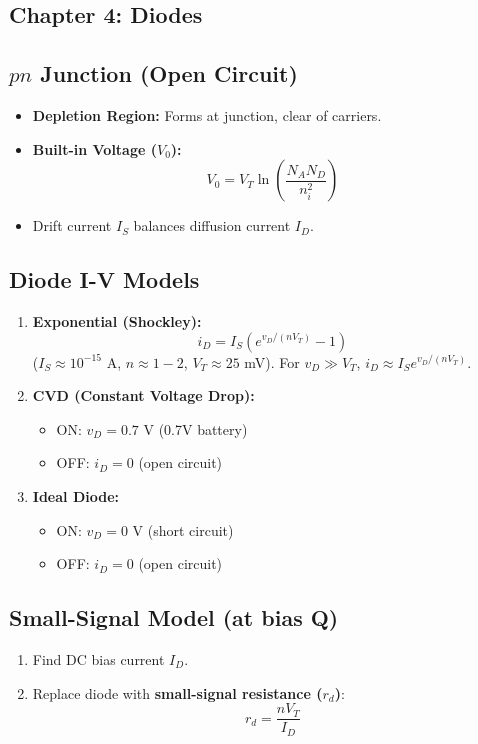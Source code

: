 \documentclass[10pt]{article}
\begin{document}
\begin{multicols*}{2}

\section{Chapter 4: Diodes}

\subsection*{$pn$ Junction (Open Circuit)}
\begin{itemize}\itemsep0pt
    \item \textbf{Depletion Region:} Forms at junction, clear of carriers.
    \item \textbf{Built-in Voltage ($V_0$):}
    \[ V_0 = V_T \ln\left(\frac{N_A N_D}{n_i^2}\right) \]
    \item Drift current $I_S$ balances diffusion current $I_D$.
\end{itemize}

\subsection*{Diode I-V Models}
\begin{enumerate}\itemsep0pt
    \item \textbf{Exponential (Shockley):}
    \[ i_D = I_S (e^{v_D / (nV_T)} - 1) \]
    ($I_S \approx 10^{-15}$ A, $n \approx 1-2$, $V_T \approx 25$ mV).
    For $v_D \gg V_T$, $i_D \approx I_S e^{v_D / (nV_T)}$.
    
    \item \textbf{CVD (Constant Voltage Drop):}
    \begin{itemize}\itemsep0pt
        \item ON: $v_D = 0.7 \text{ V}$ (0.7V battery)
        \item OFF: $i_D = 0$ (open circuit)
    \end{itemize}
    
    \item \textbf{Ideal Diode:}
    \begin{itemize}\itemsep0pt
        \item ON: $v_D = 0 \text{ V}$ (short circuit)
        \item OFF: $i_D = 0$ (open circuit)
    \end{itemize}
\end{enumerate}

\subsection*{Small-Signal Model (at bias Q)}
\begin{enumerate}\itemsep0pt
    \item Find DC bias current $I_D$.
    \item Replace diode with \textbf{small-signal resistance ($r_d$)}:
    \[ r_d = \frac{nV_T}{I_D} \]
\end{enumerate}


\end{multicols*}
\end{document}

